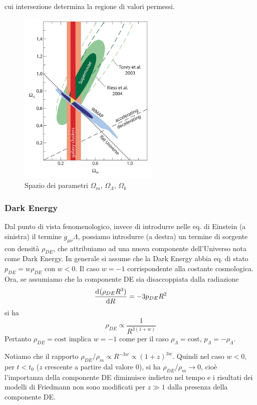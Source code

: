cui intersezione determina la regione di valori permessi.
\begin{figure}
  \centering{}
  \includegraphics[width=0.6\textwidth]{figure/Cosmological_parameters.pdf}
  \caption{Spazio dei parametri $\Omega_{m}$, $\Omega_{\Lambda}$, $\Omega_k$}
  \label{fig:Par_Cosm}
\end{figure}

\subsubsection{Dark Energy}

Dal punto di vista fenomenologico, invece di introdurre nelle eq. di Einstein (a
sinistra) il termine $g_{\mu \nu}\Lambda$, possiamo introdurre (a destra) un
termine di sorgente con densità $\rho_{DE}$, che attribuiamo ad una nuova
componente dell'Universo nota come Dark Energy.  In generale si assume che la
Dark Energy abbia eq. di stato $p_{DE}=w\rho_{DE}$ con $w<0$.  Il caso $w=-1$
corrispondente alla costante cosmologica.  Ora, se assumiamo che la componente
DE sia disaccoppiata dalla radiazione
\begin{equation}
  \frac{{\mathop{}\!\mathrm{d}^{}}(\rho_{DE} R^3)}{\mathop{}\!\mathrm{d} {R}^{}} = -3 p_{DE} R^2
\end{equation}
si ha
\begin{equation}
  \rho_{DE} \propto \frac {1}{R^{3(1+w)}}
\end{equation}
Pertanto $\rho_{DE}=\text{cost}$ implica $w=-1$ come per il caso
$\rho_{\Lambda}=\text{cost}$, $p_{\Lambda}=-\rho_{\Lambda}$.

Notiamo che il rapporto $\rho_{DE}/\rho_m \propto R^{-3w} \propto (1+z)^{3w}$.
Quindi nel caso $w<0$, per $t < t_0 $ ($z$ crescente a partire dal valore 0), si
ha $\rho_{DE}/\rho_m \to 0$, cioè l'importanza della componente DE diminuisce
indietro nel tempo e i risultati dei modelli di Friedmann non sono modificati
per $z\gg 1$ dalla presenza della componente DE.

